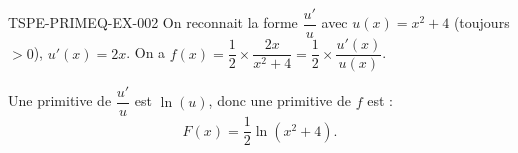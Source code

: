 \begin{corrige}{TSPE-PRIMEQ-EX-002}
On reconnait la forme $\dfrac{u'}{u}$ avec $u(x)=x^2+4$ (toujours $>0$), $u'(x)=2x$. On a $f(x) = \dfrac{1}{2} \times \dfrac{2x}{x^2+4} = \dfrac{1}{2} \times \dfrac{u'(x)}{u(x)}$.

Une primitive de $\dfrac{u'}{u}$ est $\ln(u)$, donc une primitive de $f$ est :
\[
  \boxed{F(x) = \frac{1}{2}\ln(x^2+4)}.
\]
\end{corrige}
